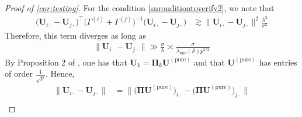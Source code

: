 \documentclass[10pt]{article}
\newcommand{\0}{{\mathbf{0}}}
\newcommand{\1}{{\mathbf{1}}}
\newcommand{\U}{{\mathbf{U}}}
\renewcommand{\citet}{\cite}
\renewcommand{\t}{^{\top}}
\newcommand{\inv}{^{-1}}
\newcommand{\pure}{^{(\mathrm{pure})}}
\begin{document}
\begin{proof}[Proof of \cref{cor:testing}]
 For the condition \eqref{snronditiontoverify2}, we note that
 \begin{align*}
    \big( \U_{i\cdot} - \U_{j\cdot} \big)\t \bigg( \Gamma^{(i)} + \Gamma^{(j)} \bigg)^{-1}  \big( \U_{i\cdot} - \U_{j\cdot} \big) &\gtrsim \| \U_{i\cdot} - \U_{j\cdot} \|^2 \frac{\lambda^2}{\sigma^2}
 \end{align*}
 Therefore, this term diverges as long as 
 \begin{align}
      \| \U_{i\cdot} - \U_{j\cdot} \| \gg \frac{\sigma}{\lambda} \asymp \frac{\sigma}{\lambda_{\min}(\mathcal{S}) p^{3/2}} \label{snrconditiontoverify3}
 \end{align}
By Proposition 2 of \citet{agterberg_estimating_2022}, one has that $\U_k = \mathbf{\Pi}_k \U\pure$ and that $\U\pure$ has entries of order $\frac{1}{\sqrt{p}}$.  Hence,
\begin{align*}
    \| \U_{i\cdot} - \U_{j\cdot} \| &= \| \big( \mathbf{\Pi }\U\pure \big)_{i\cdot} - \big( \mathbf{\Pi } \U\pure \big)_{j\cdot} \| \\

\end{align*}
\end{proof}
\end{document}

